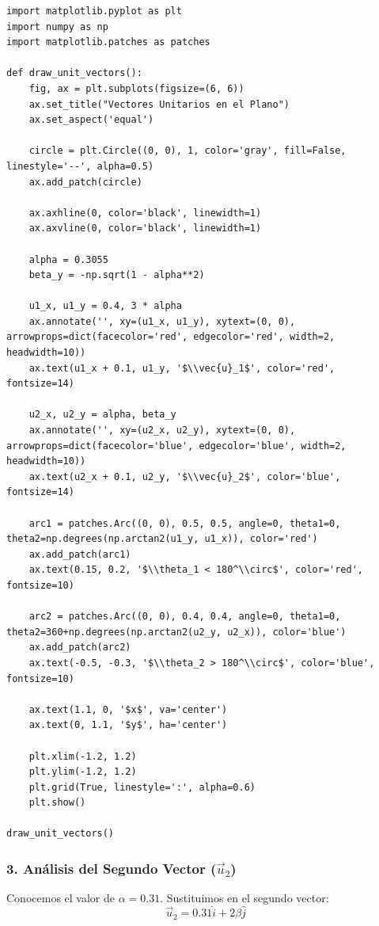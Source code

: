 \documentclass[12pt, a4paper]{article}
\begin{document}
\begin{lstlisting}
import matplotlib.pyplot as plt
import numpy as np
import matplotlib.patches as patches

def draw_unit_vectors():
    fig, ax = plt.subplots(figsize=(6, 6))
    ax.set_title("Vectores Unitarios en el Plano")
    ax.set_aspect('equal')
    
    circle = plt.Circle((0, 0), 1, color='gray', fill=False, linestyle='--', alpha=0.5)
    ax.add_patch(circle)

    ax.axhline(0, color='black', linewidth=1)
    ax.axvline(0, color='black', linewidth=1)
    
    alpha = 0.3055
    beta_y = -np.sqrt(1 - alpha**2) 
    
    u1_x, u1_y = 0.4, 3 * alpha
    ax.annotate('', xy=(u1_x, u1_y), xytext=(0, 0), arrowprops=dict(facecolor='red', edgecolor='red', width=2, headwidth=10))
    ax.text(u1_x + 0.1, u1_y, '$\\vec{u}_1$', color='red', fontsize=14)
    
    u2_x, u2_y = alpha, beta_y
    ax.annotate('', xy=(u2_x, u2_y), xytext=(0, 0), arrowprops=dict(facecolor='blue', edgecolor='blue', width=2, headwidth=10))
    ax.text(u2_x + 0.1, u2_y, '$\\vec{u}_2$', color='blue', fontsize=14)

    arc1 = patches.Arc((0, 0), 0.5, 0.5, angle=0, theta1=0, theta2=np.degrees(np.arctan2(u1_y, u1_x)), color='red')
    ax.add_patch(arc1)
    ax.text(0.15, 0.2, '$\\theta_1 < 180^\\circ$', color='red', fontsize=10)

    arc2 = patches.Arc((0, 0), 0.4, 0.4, angle=0, theta1=0, theta2=360+np.degrees(np.arctan2(u2_y, u2_x)), color='blue')
    ax.add_patch(arc2)
    ax.text(-0.5, -0.3, '$\\theta_2 > 180^\\circ$', color='blue', fontsize=10)

    ax.text(1.1, 0, '$x$', va='center')
    ax.text(0, 1.1, '$y$', ha='center')

    plt.xlim(-1.2, 1.2)
    plt.ylim(-1.2, 1.2)
    plt.grid(True, linestyle=':', alpha=0.6)
    plt.show()

draw_unit_vectors()
\end{lstlisting}

\subsubsection*{3. Análisis del Segundo Vector ($\vec{u}_2$)}
Conocemos el valor de $\alpha = 0.31$. Sustituimos en el segundo vector:
$$\vec{u}_2 = 0.31\hat{i} + 2\beta\hat{j}$$
\end{document}
